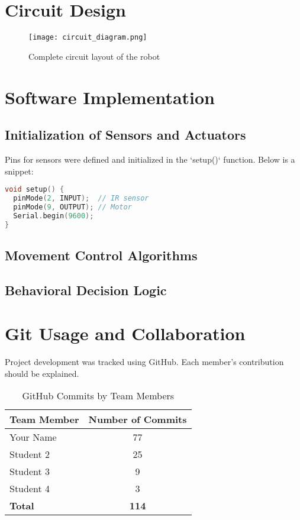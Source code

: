 \documentclass[conference]{IEEEtran}
\begin{document}
\section{Circuit Design}

\begin{figure}[htbp]
\centerline{\texttt{[image: circuit\_diagram.png]}}
\caption{Complete circuit layout of the robot}
\label{fig:circuit}
\end{figure}

\section{Software Implementation}
\label{soft}

\subsection{Initialization of Sensors and Actuators}
Pins for sensors were defined and initialized in the `setup()` function. Below is a snippet:
\begin{lstlisting}[language=C++, caption=Sensor Initialization Code]
void setup() {
  pinMode(2, INPUT);  // IR sensor
  pinMode(9, OUTPUT); // Motor
  Serial.begin(9600);
}
\end{lstlisting}

\subsection{Movement Control Algorithms}


\subsection{Behavioral Decision Logic}


\section{Git Usage and Collaboration}
Project development was tracked using GitHub. Each member's contribution should be explained.

\begin{table}[ht]
\centering
\begin{tabular}{l|c}
\hline
\textbf{Team Member} & \textbf{Number of Commits} \\
\hline
Your Name     & 77 \\
Student 2     & 25 \\
Student 3     & 9  \\
Student 4     & 3  \\
\hline
\textbf{Total} & \textbf{114} \\
\hline
\end{tabular}
\caption{GitHub Commits by Team Members}
\label{table:commit}
\end{table}
\end{document}

